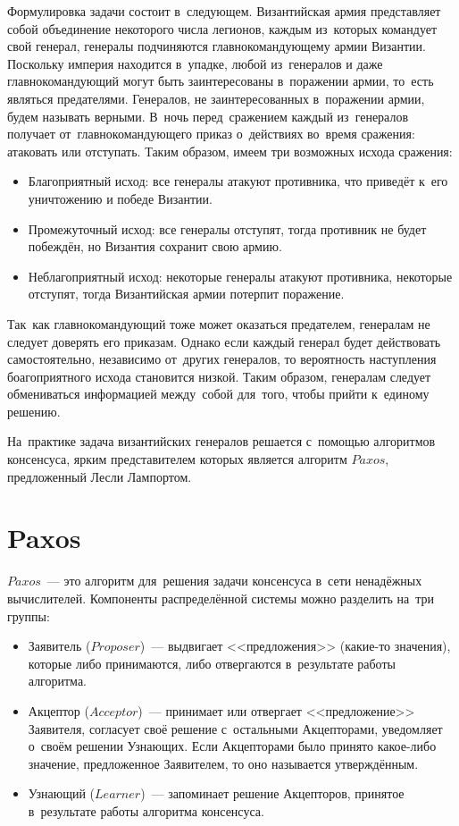 Формулировка задачи состоит в~следующем. Византийская армия представляет собой объединение некоторого числа легионов, каждым из~которых командует свой генерал, генералы подчиняются главнокомандующему армии Византии. Поскольку империя находится в~упадке, любой из~генералов и даже главнокомандующий могут быть заинтересованы в~поражении армии, то~есть являться предателями. Генералов, не заинтересованных в~поражении армии, будем называть верными. В~ночь перед~сражением каждый из~генералов получает от~главнокомандующего приказ о~действиях во~время сражения: атаковать или отступать. Таким образом, имеем три возможных исхода сражения:
\begin{itemize}
	\item Благоприятный исход: все генералы атакуют противника, что приведёт к~его уничтожению и победе Византии.
	\item Промежуточный исход: все генералы отступят, тогда противник не будет побеждён, но Византия сохранит свою армию.
	\item Неблагоприятный исход: некоторые генералы атакуют противника, некоторые отступят, тогда Византийская армии потерпит поражение.
\end{itemize}

Так~как главнокомандующий тоже может оказаться предателем, генералам не следует доверять его приказам. Однако если каждый генерал будет действовать самостоятельно, независимо от~других генералов, то вероятность наступления боагоприятного исхода становится низкой. Таким образом, генералам следует обмениваться информацией между~собой для~того, чтобы прийти к~единому решению.

На~практике задача византийских генералов решается с~помощью алгоритмов консенсуса, ярким представителем которых является алгоритм $Paxos$, предложенный Лесли Лампортом.

\section{Paxos}\label{sec:3}
$Paxos$~--- это алгоритм для~решения задачи консенсуса в~сети ненадёжных вычислителей. Компоненты распределённой системы можно разделить на~три группы:
\begin{itemize}
	\item Заявитель ($Proposer$)~--- выдвигает <<предложения>> (какие-то значения), которые либо принимаются, либо отвергаются в~результате работы алгоритма.
	\item Акцептор ($Acceptor$)~--- принимает или отвергает <<предложение>> Заявителя, согласует своё решение с~остальными Акцепторами, уведомляет о~своём решении Узнающих. Если Акцепторами было принято какое-либо значение, предложенное Заявителем, то оно называется утверждённым.
	\item Узнающий ($Learner$)~--- запоминает решение Акцепторов, принятое в~результате работы алгоритма консенсуса.
\end{itemize}

